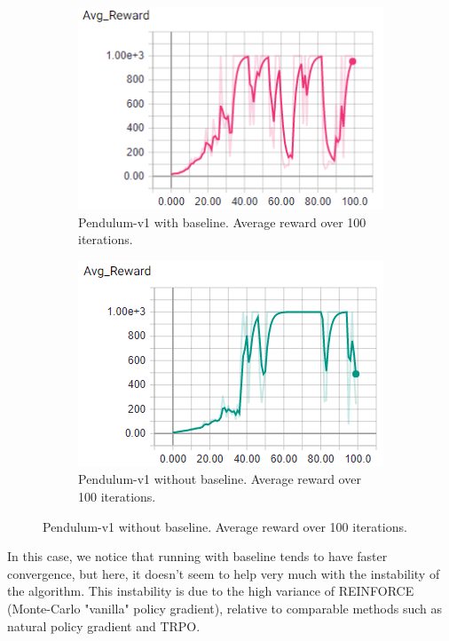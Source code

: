 \documentclass{article}
\begin{document}
\begin{enumerate}
\begin{figure}[H]
	\centering
	\begin{subfigure}[b]{.4\textwidth}
		\centering
		\includegraphics[width=0.9\linewidth]{pendulum-baseline-avgreward.png}
		\caption{Pendulum-v1 with baseline. Average reward over 100 iterations.}
	\end{subfigure}
	\qquad
	\begin{subfigure}[b]{.4\textwidth}
		\centering
		\includegraphics[width=0.9\linewidth]{pendulum-nobaseline-avgreward.png}
		\caption{Pendulum-v1 without baseline. Average reward over 100 iterations.}
	\end{subfigure}
\end{figure}

In this case, we notice that running with baseline tends to have faster convergence, but here, it doesn't seem to help very much with the instability of the algorithm. This instability is due to the high variance of REINFORCE (Monte-Carlo "vanilla" policy gradient), relative to comparable methods such as natural policy gradient and TRPO.


\end{enumerate}
\end{document}
